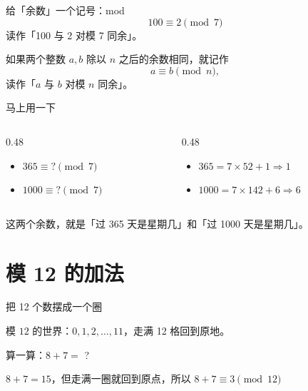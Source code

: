 \documentclass[10pt]{beamer}
\begin{document}
\begin{frame}{给「余数」一个记号：mod}
  \[
    100 \equiv 2 \pmod 7
  \]
  读作「100 与 2 对模 7 同余」。
  \pause
  \begin{definition}[同余]
    如果两个整数 \(a,b\) 除以 \(n\) 之后的余数相同，就记作
    \[
      a\equiv b \pmod n,
    \]
    读作「\(a\) 与 \(b\) 对模 \(n\) 同余」。
  \end{definition}
\end{frame}

\begin{frame}{马上用一下}
  \begin{columns}[T]
    \begin{column}{0.48\textwidth}
      \begin{itemize}
        \item \(365 \equiv \text{?} \pmod 7\)
        \item \(1000 \equiv \text{?} \pmod 7\)
      \end{itemize}
    \end{column}
    \begin{column}{0.48\textwidth}
      \pause
      \begin{itemize}
        \item \(365 = 7\times 52 + 1 \Rightarrow 1\)
        \item \(1000 = 7\times 142 + 6 \Rightarrow 6\)
      \end{itemize}
    \end{column}
  \end{columns}
  \pause
  \vspace{0.6em}
  这两个余数，就是「过 365 天是星期几」和「过 1000 天是星期几」。
\end{frame}

\section{模 12 的加法}

\begin{frame}{把 12 个数摆成一个圈}
  \begin{center}
    模 \(12\) 的世界：\(0,1,2,\dots,11\)，走满 12 格回到原地。
  \end{center}
\end{frame}

\begin{frame}{算一算：\(8+7=\) ?}
  \pause
  \begin{center}
    {\large \(8+7=15\)，但走满一圈就回到原点，所以 \textbf{\(8+7\equiv 3 \pmod{12}\)}}
  \end{center}
\end{frame}
\end{document}
